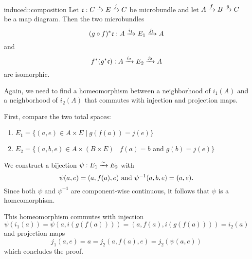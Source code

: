 \begin{mylemma}{induced::composition}
    Let $\bundledef{\bc}{C}{E}{i}{j}$ be microbundle and let $A \xto{f} B \xto{g} C$ be a map diagram.
    Then the two microbundles
    \[ \bundledef{(g \circ f)^*\bc}{A}{E_1}{i_1}{j_1} \]
    and
    \[ \bundledef{f^*(g^*\bc)}{A}{E_2}{i_2}{j_2} \]
    are isomorphic.
\end{mylemma}

\begin{myproof}
    Again, we need to find a homeomorphism between a neighborhood of $i_1(A)$ and a neighborhood of $i_2(A)$
    that commutes with injection and projection maps.
    
    First, compare the two total spaces:
    \begin{enumerate}
        \item $E_1 = \{ (a, e) \in A \times E \mid g(f(a)) = j(e)\}$ 
        \item $E_2 = \{ (a, b, e) \in A \times (B \times E) \mid f(a) = b$ and $ g(b) = j(e) \}$
    \end{enumerate}
    We construct a bijection $\psi: E_1 \isomto E_2$ with
    \[ \psi(a, e) = (a, f(a), e) \tand \psi^{-1}(a, b, e) = (a, e).\]
    Since both $\psi$ and $\psi^{-1}$ are component-wise continuous, it follows that $\psi$ is a homeomorphism.

    This homeomorphism commutes with injection
    \[ \psi(i_1(a)) = \psi(a, i(g(f(a)))) = (a, f(a), i(g(f(a)))) = i_2(a) \]
    and projection maps
    \[ j_1(a, e) = a = j_2(a, f(a), e) = j_2(\psi(a, e)) \]
    which concludes the proof.
\end{myproof}